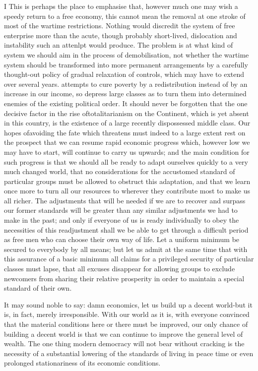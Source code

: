\documentclass[11pt,openany]{book}
\begin{document}
I This is perhaps the place to emphasise that, however much one may wish a speedy return to a free economy, this cannot mean the removal at one stroke of most of the wartime restrictions. Nothing would discredit the system of free enterprise more than the acute, though probably short-lived, dislocation and instability such an attenlpt would produce. The problem is at what kind of system we should aim in the process of demobilisation, not whether the wartime system should be transformed into more permanent arrangements by a carefully thought-out policy of gradual relaxation of controls, which may have to extend over several years. attempts to cure poverty by a redistribution instead of by an increase in our income, so depress large classes as to turn them into determined enemies of the existing political order. It should never be forgotten that the one decisive factor in the rise oftotalitarianism on the Continent, which is yet absent in this country, is the existence of a large recently dispossessed middle class. Our hopes ofavoiding the fate which threatens must indeed to a large extent rest on the prospect that we can resume rapid economic progress which, however low we may have to start, will continue to carry us upwards; and the main condition for such progress is that we should all be ready to adapt ourselves quickly to a very much changed world, that no considerations for the accustomed standard of particular groups must be allowed to obstruct this adaptation, and that we learn once more to turn all our resources to wherever they contribute most to make us all richer. The adjustments that will be needed if we are to recover and surpass our former standards will be greater than any similar adjustments we had to make in the past; and only if everyone of us is ready individually to obey the necessities of this readjustment shall we be able to get through a difficult period as free men who can choose their own way of life. Let a uniform minimum be secured to everybody by all means; but let us admit at the same time that with this assurance of a basic minimum all claims for a privileged security of particular classes must lapse, that all excuses disappear for allowing groups to exclude newcomers from sharing their relative prosperity in order to maintain a special standard of their own.

It may sound noble to say: damn economics, let us build up a decent world-but it is, in fact, merely irresponsible. With our world as it is, with everyone convinced that the material conditions here or there must be improved, our only chance of building a decent world is that we can continue to improve the general level of wealth. The one thing modern democracy will not bear without cracking is the necessity of a substantial lowering of the standards of living in peace time or even prolonged stationariness of its economic conditions.
\end{document}
